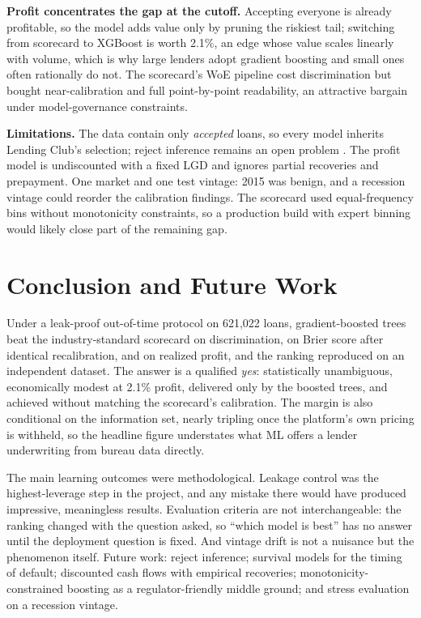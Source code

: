 \documentclass[a4paper,twocolumn,10pt]{article}
\begin{document}
\textbf{Profit concentrates the gap at the cutoff.} Accepting everyone is already profitable, so the model adds value only by pruning the riskiest tail; switching from scorecard to XGBoost is worth 2.1\%, an edge whose value scales linearly with volume, which is why large lenders adopt gradient boosting and small ones often rationally do not. The scorecard's WoE pipeline cost discrimination but bought near-calibration and full point-by-point readability, an attractive bargain under model-governance constraints.

\textbf{Limitations.} The data contain only \emph{accepted} loans, so every model inherits Lending Club's selection; reject inference remains an open problem \cite{hand1997}. The profit model is undiscounted with a fixed LGD and ignores partial recoveries and prepayment. One market and one test vintage: 2015 was benign, and a recession vintage could reorder the calibration findings. The scorecard used equal-frequency bins without monotonicity constraints, so a production build with expert binning would likely close part of the remaining gap.

\section{Conclusion and Future Work}

Under a leak-proof out-of-time protocol on 621{,}022 loans, gradient-boosted trees beat the industry-standard scorecard on discrimination, on Brier score after identical recalibration, and on realized profit, and the ranking reproduced on an independent dataset. The answer is a qualified \emph{yes}: statistically unambiguous, economically modest at 2.1\% profit, delivered only by the boosted trees, and achieved without matching the scorecard's calibration. The margin is also conditional on the information set, nearly tripling once the platform's own pricing is withheld, so the headline figure understates what ML offers a lender underwriting from bureau data directly.

The main learning outcomes were methodological. Leakage control was the highest-leverage step in the project, and any mistake there would have produced impressive, meaningless results. Evaluation criteria are not interchangeable: the ranking changed with the question asked, so ``which model is best'' has no answer until the deployment question is fixed. And vintage drift is not a nuisance but the phenomenon itself. Future work: reject inference; survival models for the timing of default; discounted cash flows with empirical recoveries; monotonicity-constrained boosting as a regulator-friendly middle ground; and stress evaluation on a recession vintage.
\end{document}
